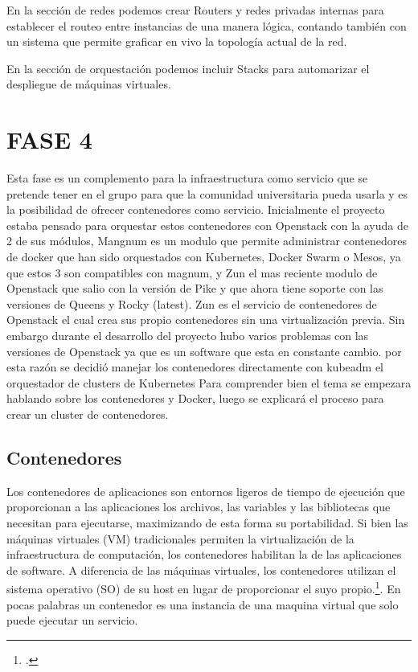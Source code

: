     En la sección de redes podemos crear Routers y redes privadas internas para establecer el routeo entre instancias de una manera lógica, contando también con un sistema que permite graficar en vivo la topología actual de la red.
    
    En la sección de orquestación podemos incluir Stacks para automarizar el despliegue de máquinas virtuales.
    
    \section{FASE 4}
    Esta fase es un complemento para la infraestructura como servicio que se pretende tener en el grupo para que la comunidad universitaria pueda usarla y es la posibilidad de ofrecer contenedores como servicio. Inicialmente el proyecto estaba pensado para orquestar estos contenedores con Openstack con la ayuda de 2 de sus módulos, Mangnum es un modulo que permite administrar contenedores de docker que han sido orquestados con Kubernetes, Docker Swarm o Mesos, ya que estos 3 son compatibles con magnum, y Zun el mas reciente modulo de Openstack que salio con la versión de Pike y que ahora tiene soporte con las versiones de Queens y Rocky (latest). Zun es el servicio de contenedores de Openstack el cual crea sus propio contenedores sin una virtualización previa. Sin embargo durante el desarrollo del proyecto hubo varios problemas con las versiones de  Openstack ya que es un software que esta en constante cambio. por esta razón se decidió manejar los contenedores directamente con kubeadm el orquestador de clusters de Kubernetes Para comprender bien el tema se empezara hablando sobre los contenedores y Docker, luego se explicará el proceso para crear un cluster de contenedores.
    
    \subsection{Contenedores}
    Los contenedores de aplicaciones son entornos ligeros de tiempo de ejecución que proporcionan a las aplicaciones los archivos, las variables y las bibliotecas que necesitan para ejecutarse, maximizando de esta forma su portabilidad. Si bien las máquinas virtuales (VM) tradicionales permiten la virtualización de la infraestructura de computación, los contenedores habilitan la de las aplicaciones de software. A diferencia de las máquinas virtuales, los contenedores utilizan el sistema operativo (SO) de su host en lugar de proporcionar el suyo propio.\footcite[][]{hpe-contenedore}. En pocas palabras un contenedor es una instancia de una maquina virtual que solo puede ejecutar un servicio.
    
